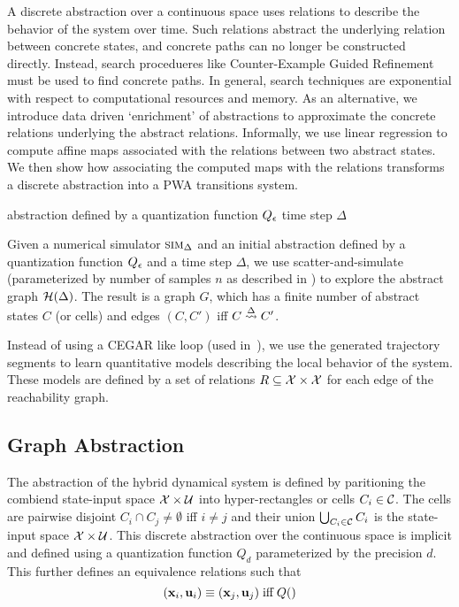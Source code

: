 
A discrete abstraction over a continuous space uses relations to
describe the behavior of the system over time. Such relations abstract
the underlying relation between concrete states, and concrete paths
can no longer be constructed directly. Instead, search procedueres
like Counter-Example Guided Refinement must be used to find concrete
paths. In general, search techniques are exponential with respect to
computational resources and memory. As an alternative, we introduce
data driven `enrichment' of abstractions to approximate the concrete
relations underlying the abstract relations. Informally, we use linear
regression to compute affine maps associated with the relations
between two abstract states. We then show how associating the computed
maps with the relations transforms a discrete abstraction into a PWA
transitions system.


abstraction defined by a quantization function $Q_\epsilon$
time step $\Delta$


Given a numerical simulator
$\mbox{\sc sim}_\Delta$ and an initial abstraction defined by a quantization
function $Q_\epsilon$ and a time step $\Delta$, we use
scatter-and-simulate (parameterized by number of samples $n$ as
described in \cite{zutshi2014multiple}) to explore the abstract graph
$\mathcal{H}(\Delta)$. The result is a graph $G$, which has a finite
number of abstract states $C$ (or cells) and edges $(C,C')$ iff $C
\overset{\Delta}{\rightsquigarrow} C'$.

Instead of using a CEGAR like loop (used in~\cite{zutshi2014multiple}),
we use the generated trajectory segments to learn quantitative models
describing the local behavior of the system. These models are defined
by a set of relations $R \subseteq \mathcal{X} \times \mathcal{X}$
for each edge of the reachability graph.


\subsection{Graph Abstraction}
The abstraction of the hybrid dynamical system is defined by
paritioning the combiend state-input space $\mathcal{X} \times
\mathcal{U}$ into hyper-rectangles or cells $C_i \in \mathcal{C}$. The cells are
pairwise disjoint $C_i \cap C_j \neq \emptyset$ iff $i \neq j$ and
their union $\bigcup_{C_i\in\mathcal{C}}C_i$ is the state-input
space $\mathcal{X} \times \mathcal{U}$. This discrete abstraction over
the continuous space is implicit and defined using a quantization
function $Q_d$ parameterized by the precision $d$.
This further
defines an equivalence relations such that
\[
    (\mathbf{x}_i, \mathbf{u}_i) \equiv (\mathbf{x}_j, \mathbf{u}_j) \;\text{iff}\; Q()
\]

